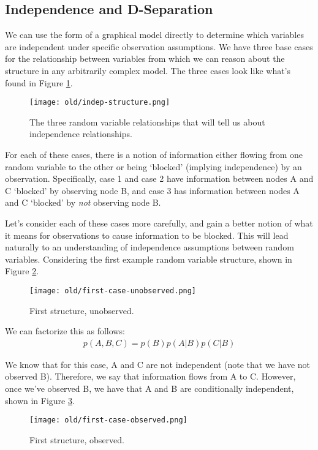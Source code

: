 \subsection{Independence and D-Separation}
We can use the form of a graphical model directly to determine which variables are independent under specific observation assumptions. We have three base cases for the relationship between variables from which we can reason about the structure in any arbitrarily complex model. The three cases look like what's found in Figure \ref{fig:indep-structure}.
\begin{figure}
	\centering
	\texttt{[image: old/indep-structure.png]}
    \caption{The three random variable relationships that will tell us about independence relationships.}
	\label{fig:indep-structure}
\end{figure}
For each of these cases, there is a notion of information either flowing from one random variable to the other or being `blocked' (implying independence) by an observation. Specifically, case 1 and case 2 have information between nodes A and C `blocked' by observing node B, and case 3 has information between nodes A and C `blocked' by \textit{not} observing node B.

Let's consider each of these cases more carefully, and gain a better notion of what it means for observations to cause information to be blocked. This will lead naturally to an understanding of independence assumptions between random variables. Considering the first example random variable structure, shown in Figure \ref{fig:first-case-unobserved}.

\begin{figure}
	\centering
	\texttt{[image: old/first-case-unobserved.png]}
	\caption{First structure, unobserved.}
	\label{fig:first-case-unobserved}
\end{figure}

We can factorize this as follows:
\begin{align*}
	p(A, B, C) = p(B) p(A | B) p(C | B)
\end{align*}

We know that for this case, A and C are not independent (note that we have not observed B). Therefore, we say that information flows from A to C. However, once we've observed B, we have that A and B are conditionally independent, shown in Figure \ref{fig:first-case-observed}.

\begin{figure}
	\centering
	\texttt{[image: old/first-case-observed.png]}
	\caption{First structure, observed.}
	\label{fig:first-case-observed}
\end{figure}

